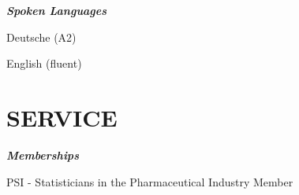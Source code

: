 \documentclass[13pt,]{article}
\providecommand{\tightlist}{%
  \setlength{\itemsep}{0pt}\setlength{\parskip}{0pt}}
\renewenvironment{itemize}{
  \begin{list}{}{
    \setlength{\leftmargin}{1.5em}
  }
}{
  \end{list}
}
\begin{document}
\emph{\textbf{Spoken Languages}}

\begin{itemize}
\tightlist
\item
  Deutsche (A2)
\item
  English (fluent)
\end{itemize}

\hypertarget{service}{%
\section{\texorpdfstring{\textbf{SERVICE}}{SERVICE}}\label{service}}

\emph{\textbf{Memberships}}

PSI - Statisticians in the Pharmaceutical Industry \hfill Member
\end{document}
